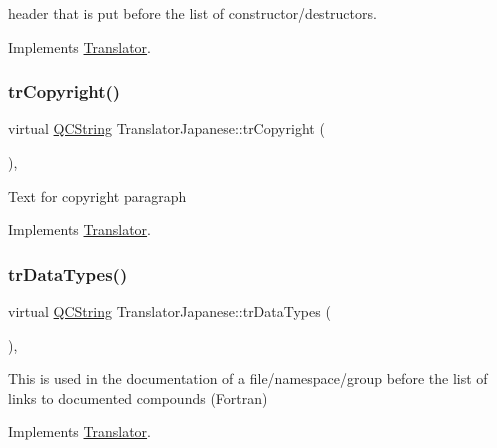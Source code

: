 header that is put before the list of constructor/destructors. 

Implements \mbox{\hyperlink{class_translator}{Translator}}.

\mbox{\label{class_translator_japanese_a1d736d77bc42bc6cc37db2f620ff9121}} 
\subsubsection{\texorpdfstring{trCopyright()}{trCopyright()}}
{\footnotesize\ttfamily virtual \mbox{\hyperlink{class_q_c_string}{Q\+C\+String}} Translator\+Japanese\+::tr\+Copyright (\begin{DoxyParamCaption}{ }\end{DoxyParamCaption})\hspace{0.3cm}{\ttfamily [inline]}, {\ttfamily [virtual]}}

Text for copyright paragraph 

Implements \mbox{\hyperlink{class_translator}{Translator}}.

\mbox{\label{class_translator_japanese_a45062c61a35ca4f9dab8f943c9a26c13}} 
\subsubsection{\texorpdfstring{trDataTypes()}{trDataTypes()}}
{\footnotesize\ttfamily virtual \mbox{\hyperlink{class_q_c_string}{Q\+C\+String}} Translator\+Japanese\+::tr\+Data\+Types (\begin{DoxyParamCaption}{ }\end{DoxyParamCaption})\hspace{0.3cm}{\ttfamily [inline]}, {\ttfamily [virtual]}}

This is used in the documentation of a file/namespace/group before the list of links to documented compounds (Fortran) 

Implements \mbox{\hyperlink{class_translator}{Translator}}.

\mbox{\label{class_translator_japanese_a6d30bcc9994ff9850dd7cdb4892fcf85}} 
